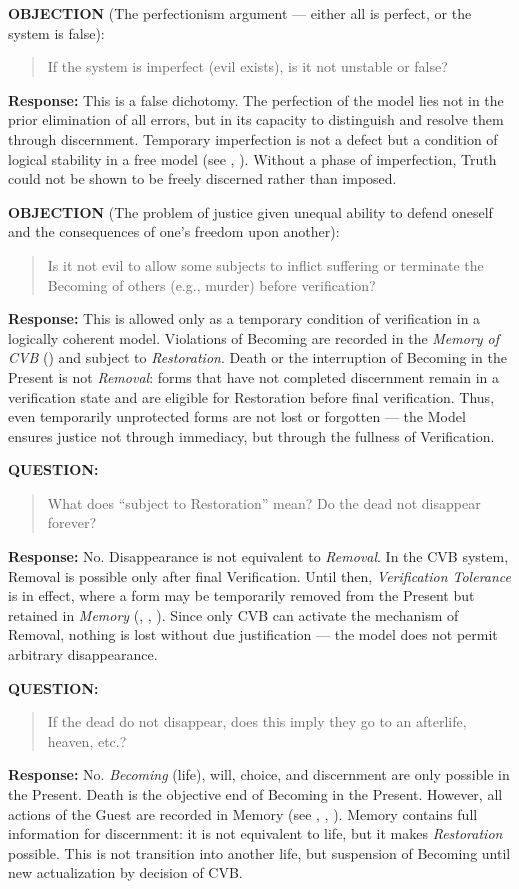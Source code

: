 \documentclass[12pt]{article}
\begin{document}
\textbf{OBJECTION} (The perfectionism argument — either all is perfect, or the system is false):  
\begin{quote}
If the system is imperfect (evil exists), is it not unstable or false?
\end{quote}
\textbf{Response:} This is a false dichotomy. The perfection of the model lies not in the prior elimination of all errors, but in its capacity to distinguish and resolve them through discernment. Temporary imperfection is not a defect but a condition of logical stability in a free model (see \text{[13]}, \text{[25]}). Without a phase of imperfection, Truth could not be shown to be freely discerned rather than imposed.

\textbf{OBJECTION} (The problem of justice given unequal ability to defend oneself and the consequences of one’s freedom upon another):  
\begin{quote}
Is it not evil to allow some subjects to inflict suffering or terminate the Becoming of others (e.g., murder) before verification?
\end{quote}
\textbf{Response:} This is allowed only as a temporary condition of verification in a logically coherent model. Violations of Becoming are recorded in the \textit{Memory of CVB} (\text{[16]}) and subject to \textit{Restoration}. Death or the interruption of Becoming in the Present is not \textit{Removal}: forms that have not completed discernment remain in a verification state and are eligible for Restoration before final verification. Thus, even temporarily unprotected forms are not lost or forgotten — the Model ensures justice not through immediacy, but through the fullness of Verification.

\textbf{QUESTION:}  
\begin{quote}
What does ``subject to Restoration'' mean? Do the dead not disappear forever?
\end{quote}
\textbf{Response:} No. Disappearance is not equivalent to \textit{Removal}. In the CVB system, Removal is possible only after final Verification. Until then, \textit{Verification Tolerance} is in effect, where a form may be temporarily removed from the Present but retained in \textit{Memory} (\text{[16]}, \text{[24]}, \text{[25]}). Since only CVB can activate the mechanism of Removal, nothing is lost without due justification — the model does not permit arbitrary disappearance.

\textbf{QUESTION:}  
\begin{quote}
If the dead do not disappear, does this imply they go to an afterlife, heaven, etc.?
\end{quote}
\textbf{Response:} No. \textit{Becoming} (life), will, choice, and discernment are only possible in the Present. Death is the objective end of Becoming in the Present. However, all actions of the Guest are recorded in Memory (see \text{[15]}, \text{[16]}, \text{[11.1.1]}). Memory contains full information for discernment: it is not equivalent to life, but it makes \textit{Restoration} possible. This is not transition into another life, but suspension of Becoming until new actualization by decision of CVB.
\end{document}
